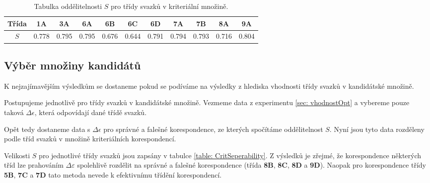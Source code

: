  \begin{table}
\centering
\begin{tabular}{|c||c|c|c|c|c|c|c|c|c|c|}
\hline
Třída & \textbf{1A} & \textbf{3A} & \textbf{6A}  & \textbf{6B} & \textbf{6C} & \textbf{6D} & \textbf{7A} & \textbf{7B}& \textbf{8A} & \textbf{9A}\\
\hline
$S$   &0.778 & 0.795 & 0.795 & 0.676 & 0.644 & 0.791 & 0.794 & 0.793 & 0.716 & 0.804 \\
\hline
\end{tabular}
\caption{Tabulka oddělitelnosti $S$ pro třídy svazků v kriteriální množině.}
\label{table: GroupSeperability}
\end{table}

\subsection{Výběr množiny kandidátů }
	K nejzajímavějším výsledkům se dostaneme pokud se podíváme na výsledky z hlediska vhodnosti třídy svazků v kandidátské množině. 
	
	Postupujeme jednotlivě pro třídy svazků v kandidátské množině. Vezmeme data z experimentu \ref{sec: vhodnostOpt} a vybereme pouze taková $\Delta\epsilon$, která odpovídají dané třídě svazků.
	
	 Opět tedy dostaneme data s $\Delta\epsilon$ pro správné a falešné korespondence, ze kterých spočítáme oddělitelnost $S$. Nyní jsou tyto data rozděleny podle tříd svazků v množině kriteriálních korespondencí. 
	 
	 Velikosti $S$  pro jednotlivé třídy svazků jsou zapsány v tabulce \ref{table: CritSeperability}. Z výsledků je zřejmé, že korespondence některých tříd lze prahováním  $\Delta\varepsilon$ spolehlivě rozdělit na správné a falešné korespondence (třída \textbf{8B}, \textbf{8C}, \textbf{8D} a \textbf{9D}). Naopak pro korespondence třídy \textbf{5B}, \textbf{7C} a \textbf{7D} tato metoda nevede k efektivnímu třídění korespondencí. 

